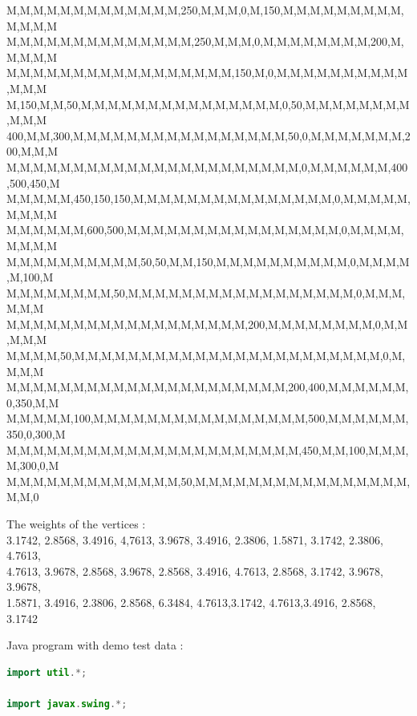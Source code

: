 \documentclass[12pt]{article}
\begin{document}
\begin{subappendices}
{{M,M,M,M,M,M,M,M,M,M,M,M,M,250,M,M,M,0,M,150,M,M,M,M,M,M,M,M,M,M,M,M,M}\\
{M,M,M,M,M,M,M,M,M,M,M,M,M,M,250,M,M,M,0,M,M,M,M,M,M,M,M,200,M,M,M,M,M}\\
{M,M,M,M,M,M,M,M,M,M,M,M,M,M,M,M,M,150,M,0,M,M,M,M,M,M,M,M,M,M,M,M,M}\\
{M,150,M,M,50,M,M,M,M,M,M,M,M,M,M,M,M,M,M,M,0,50,M,M,M,M,M,M,M,M,M,M,M}\\
{400,M,M,300,M,M,M,M,M,M,M,M,M,M,M,M,M,M,M,M,50,0,M,M,M,M,M,M,M,200,M,M,M}\\
{M,M,M,M,M,M,M,M,M,M,M,M,M,M,M,M,M,M,M,M,M,M,0,M,M,M,M,M,M,400,500,450,M}\\
{M,M,M,M,M,450,150,150,M,M,M,M,M,M,M,M,M,M,M,M,M,M,M,0,M,M,M,M,M,M,M,M,M}\\
{M,M,M,M,M,M,600,500,M,M,M,M,M,M,M,M,M,M,M,M,M,M,M,M,0,M,M,M,M,M,M,M,M}\\
{M,M,M,M,M,M,M,M,M,M,50,50,M,M,150,M,M,M,M,M,M,M,M,M,M,0,M,M,M,M,M,100,M}\\
{M,M,M,M,M,M,M,M,50,M,M,M,M,M,M,M,M,M,M,M,M,M,M,M,M,M,0,M,M,M,M,M,M}\\
{M,M,M,M,M,M,M,M,M,M,M,M,M,M,M,M,M,M,200,M,M,M,M,M,M,M,M,0,M,M,M,M,M}\\
{M,M,M,M,50,M,M,M,M,M,M,M,M,M,M,M,M,M,M,M,M,M,M,M,M,M,M,M,0,M,M,M,M}\\
{M,M,M,M,M,M,M,M,M,M,M,M,M,M,M,M,M,M,M,M,M,200,400,M,M,M,M,M,M,0,350,M,M}\\
{M,M,M,M,M,100,M,M,M,M,M,M,M,M,M,M,M,M,M,M,M,M,500,M,M,M,M,M,M,350,0,300,M}\\
{M,M,M,M,M,M,M,M,M,M,M,M,M,M,M,M,M,M,M,M,M,M,450,M,M,100,M,M,M,M,300,0,M}\\
{M,M,M,M,M,M,M,M,M,M,M,M,M,50,M,M,M,M,M,M,M,M,M,M,M,M,M,M,M,M,M,M,0}\\
}


The weights of the vertices :\\
3.1742, 2.8568, 3.4916, 4,7613, 3.9678, 3.4916, 2.3806, 1.5871, 3.1742, 2.3806, 4.7613, \\
4.7613, 3.9678, 2.8568, 3.9678, 2.8568, 3.4916, 4.7613, 2.8568, 3.1742, 3.9678, 3.9678, \\
1.5871, 3.4916, 2.3806, 2.8568, 6.3484, 4.7613,3.1742, 4.7613,3.4916, 2.8568, 3.1742

Java program with demo test data :


\begin{lstlisting}[language=Java, caption=\texttt{Demo program}]
	import util.*;

import javax.swing.*;


\end{lstlisting}
\end{subappendices}
\end{document}
